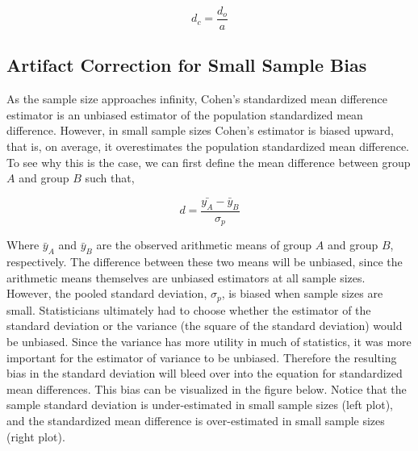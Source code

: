 \documentclass[
  letterpaper,
  DIV=11,
  numbers=noendperiod]{scrreprt}
\begin{document}
\[
d_c = \frac{d_o}{a}
\]

\hypertarget{artifact-correction-for-small-sample-bias}{%
\subsection{Artifact Correction for Small Sample
Bias}\label{artifact-correction-for-small-sample-bias}}

As the sample size approaches infinity, Cohen's standardized mean
difference estimator is an unbiased estimator of the population
standardized mean difference. However, in small sample sizes Cohen's
estimator is biased upward, that is, on average, it overestimates the
population standardized mean difference. To see why this is the case, we
can first define the mean difference between group \(A\) and group \(B\)
such that,

\[
d = \frac{\bar{y_A}-\bar{y}_B}{\sigma_p}
\]

Where \(\bar{y}_A\) and \(\bar{y}_B\) are the observed arithmetic means
of group \(A\) and group \(B\), respectively. The difference between
these two means will be unbiased, since the arithmetic means themselves
are unbiased estimators at all sample sizes. However, the pooled
standard deviation, \(\sigma_p\), is biased when sample sizes are small.
Statisticians ultimately had to choose whether the estimator of the
standard deviation or the variance (the square of the standard
deviation) would be unbiased. Since the variance has more utility in
much of statistics, it was more important for the estimator of variance
to be unbiased. Therefore the resulting bias in the standard deviation
will bleed over into the equation for standardized mean differences.
This bias can be visualized in the figure below. Notice that the sample
standard deviation is under-estimated in small sample sizes (left plot),
and the standardized mean difference is over-estimated in small sample
sizes (right plot).
\end{document}
